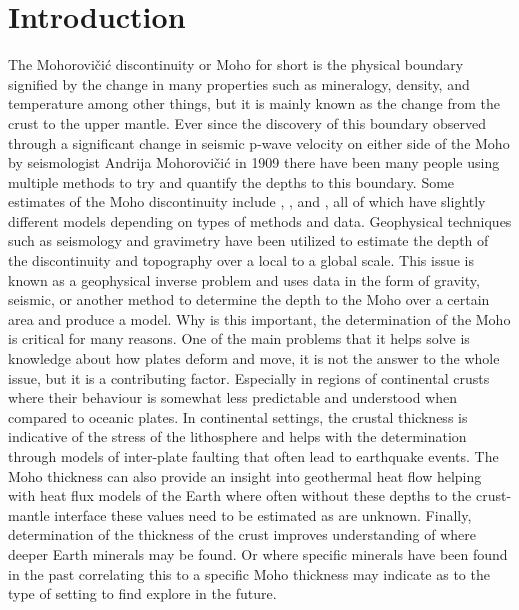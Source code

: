 \chapter{Introduction}

The Mohorovičić discontinuity or Moho for short is the physical boundary signified by the change in many properties such as mineralogy, density, and temperature among other things, but it is mainly known as the change from the crust to the upper mantle. Ever since the discovery of this boundary observed through a significant change in seismic p-wave velocity on either side of the Moho by seismologist Andrija Mohorovičić in 1909 there have been many people using multiple methods to try and quantify the depths to this boundary. Some estimates of the Moho discontinuity include \cite{Laske2013}, \cite{Assumpo2013}, and \cite{Reguzzoni2015}, all of which have slightly different models depending on types of methods and data. Geophysical techniques such as seismology and gravimetry have been utilized to estimate the depth of the discontinuity and topography over a local to a global scale. This issue is known as a geophysical inverse problem and uses data in the form of gravity, seismic, or another method to determine the depth to the Moho over a certain area and produce a model.
Why is this important, the determination of the Moho is critical for many reasons. One of the main problems that it helps solve is knowledge about how plates deform and move, it is not the answer to the whole issue, but it is a contributing factor. Especially in regions of continental crusts where their behaviour is somewhat less predictable and understood when compared to oceanic plates. In continental settings, the crustal thickness is indicative of the stress of the lithosphere and helps with the determination through models of inter-plate faulting that often lead to earthquake events. The Moho thickness can also provide an insight into geothermal heat flow helping with heat flux models of the Earth where often without these depths to the crust-mantle interface these values need to be estimated as are unknown. Finally, determination of the thickness of the crust improves understanding of where deeper Earth minerals may be found. Or where specific minerals have been found in the past correlating this to a specific Moho thickness may indicate as to the type of setting to find explore in the future.
